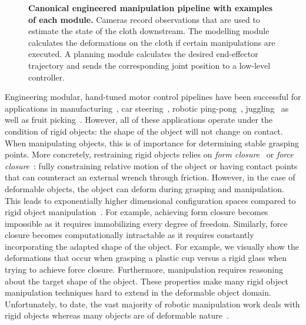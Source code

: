 \begin{figure}[p]
    \centering
    
    \vspace*{-10mm}
    \caption[Canonical engineered manipulation pipeline.]{\textbf{Canonical engineered manipulation pipeline with examples of each module.} Cameras record observations that are used to estimate the state of the cloth downstream. The modelling module calculates the deformations on the cloth if certain manipulations are executed. A planning module calculates the desired end-effector trajectory and sends the corresponding joint position to a low-level controller.
    }
    \label{fig:canonical_robotic_manipulation_engineered_pipeline}
\end{figure}

Engineering modular, hand-tuned motor control pipelines have been successful for applications in manufacturing~\autocite{Clocksin1985,Mochizuki1987}, car steering~\autocite{Dickmanns1988}, robotic ping-pong~\autocite{Andersson1987}, juggling~\autocite{Rizzi1993} as well as fruit picking~\autocite{Harrell1989}. However, all of these applications operate under the condition of rigid objects: the shape of the object will not change on contact.
When manipulating objects, this is of importance for determining stable grasping points. More concretely, restraining rigid objects relies on \textit{form closure}~\autocite{Nguyen1988} or \textit{force closure}~\autocite{Bicchi1995}: fully constraining relative motion of the object or having contact points that can counteract an external wrench through friction.
However, in the case of deformable objects, the object can deform during grasping and manipulation. This leads to exponentially higher dimensional configuration spaces compared to rigid object manipulation~\autocite{Foresti2004}. For example, achieving form closure becomes impossible as it requires immobilizing every degree of freedom. Similarly, force closure becomes computationally intractable as it requires constantly incorporating the adapted shape of the object. For example, we visually show the deformations that occur when grasping a plastic cup versus a rigid glass when trying to achieve force closure. Furthermore, manipulation requires reasoning about the target shape of the object. These properties make many rigid object manipulation techniques hard to extend in the deformable object domain. Unfortunately, to date, the vast majority of robotic manipulation work deals with rigid objects whereas many objects are of deformable nature~\autocite{Siciliano2008}.

